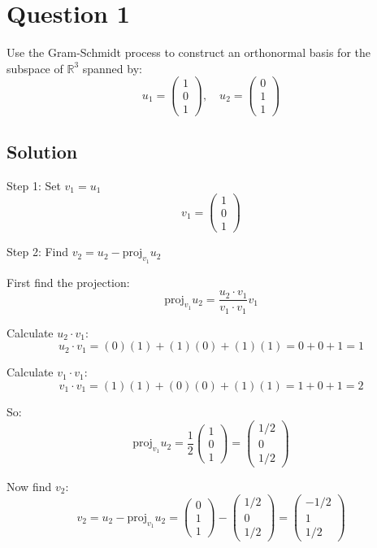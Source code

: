 \documentclass[12pt]{article}
\begin{document}
\section*{Question 1}
Use the Gram-Schmidt process to construct an orthonormal basis for the subspace of $\mathbb{R}^3$ spanned by:
\[
u_1 = \begin{pmatrix} 1 \\ 0 \\ 1 \end{pmatrix}, \quad u_2 = \begin{pmatrix} 0 \\ 1 \\ 1 \end{pmatrix}
\]

\subsection*{Solution}

Step 1: Set $v_1 = u_1$
\[
v_1 = \begin{pmatrix} 1 \\ 0 \\ 1 \end{pmatrix}
\]

Step 2: Find $v_2 = u_2 - \text{proj}_{v_1} u_2$

First find the projection:
\[
\text{proj}_{v_1} u_2 = \frac{u_2 \cdot v_1}{v_1 \cdot v_1} v_1
\]

Calculate $u_2 \cdot v_1$:
\[
u_2 \cdot v_1 = (0)(1) + (1)(0) + (1)(1) = 0 + 0 + 1 = 1
\]

Calculate $v_1 \cdot v_1$:
\[
v_1 \cdot v_1 = (1)(1) + (0)(0) + (1)(1) = 1 + 0 + 1 = 2
\]

So:
\[
\text{proj}_{v_1} u_2 = \frac{1}{2} \begin{pmatrix} 1 \\ 0 \\ 1 \end{pmatrix} = \begin{pmatrix} 1/2 \\ 0 \\ 1/2 \end{pmatrix}
\]

Now find $v_2$:
\[
v_2 = u_2 - \text{proj}_{v_1} u_2 = \begin{pmatrix} 0 \\ 1 \\ 1 \end{pmatrix} - \begin{pmatrix} 1/2 \\ 0 \\ 1/2 \end{pmatrix} = \begin{pmatrix} -1/2 \\ 1 \\ 1/2 \end{pmatrix}
\]
\end{document}
